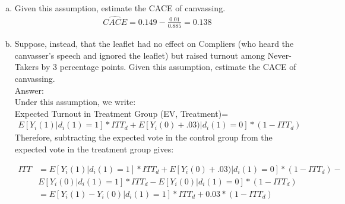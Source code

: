 \documentclass[11pt,notitlepage]{article}\usepackage[]{graphicx}\usepackage[]{color}
\begin{document}
\begin{enumerate}[a)]
Expected Turnout in Treatment Group (EV, Treatment):
\begin{align*}
& E[Y_i(1) + .01)|d_i(1)=1]*ITT_d + E[Y_i(0)+.01)|d_i(1)=0]*(1-ITT_d) = \\
& E[Y_i(1)|d_i(1)=1]*ITT_d + E[Y_i(0)|d_i(1)=0]*(1-ITT_d) + .01\\
\end{align*}
Expected Turnout in Control Group (EV, Control):
\begin{align*}
& E[Y_i(0)|d_i(1)=1]*ITT_d + E[Y_i(0)|d_i(1)=0]*(1-ITT_d) \\
\end{align*}
(EV, Treatment) - (EV, Control) = ITT:
\begin{align*}
ITT &= .01 + E[Y_i(1)|d_i(1)=1]*ITT_d  - E[Y_i(0)|d_i(1)=1]*ITT_d\\
&= .01 + E[Y_i(1) - Y_i(0)|d_i(1)=1]*ITT_d \\
ITT/ITTd &=  E[Y_i(1) - Y_i(0)|d_i(1)=1] + \frac{.01}{ITT_d}.\\ 
\end{align*}
Therefore:
\begin{align*}
CACE &= E (Yi(1) - Yi(0)|di(1)=1) = ITT/ITTd - .01/ITTd
\end{align*}

\item Given this assumption, estimate the CACE of canvassing.
\begin{align*}
\widehat{CACE} = 0.149 - \frac{0.01}{0.885} = 0.138
\end{align*}
\item Suppose, instead, that the leaflet had no effect on Compliers (who heard the canvasser's speech and ignored the leaflet) but raised turnout among Never-Takers by 3 percentage points. Given this assumption, estimate the CACE of canvassing.\\
Answer:\\
Under this assumption, we write:\\
Expected Turnout in Treatment Group (EV, Treatment)=
\begin{align*}
E[Y_i(1)|d_i(1)=1]* ITT_d + E[Y_i(0)+.03)|d_i(1)=0]*(1-ITT_d)
\end{align*}
Therefore, subtracting the expected vote in the control group from the expected vote in the treatment group gives:

\begin{align*}
ITT &= E[Y_i(1)|d_i(1)=1]* ITT_d + E[Y_i(0)+.03)|d_i(1)=0]*(1-ITT_d) - \\
& E[Y_i(0)|d_i(1)=1]*ITT_d - E[Y_i(0)|d_i(1)=0]*(1-ITT_d) \\
&= E[Y_i(1) - Y_i(0)|d_i(1)=1]*ITT_d + 0.03*(1-ITT_d)
\end{align*}


\end{enumerate}
\end{document}
